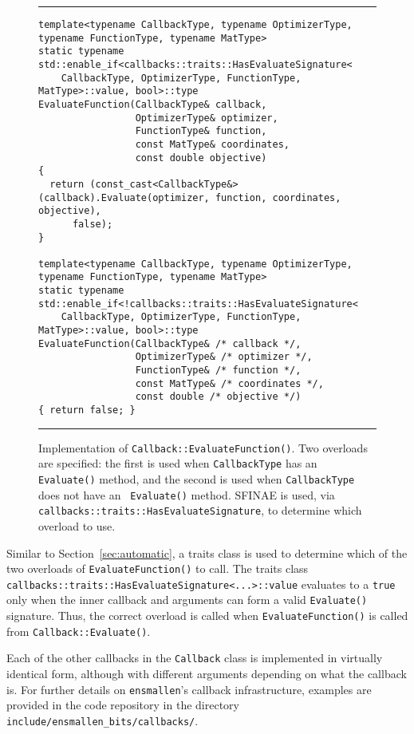 \begin{figure}[t!]
\hrule
\vspace{1ex}
\begin{verbatim}
template<typename CallbackType, typename OptimizerType, typename FunctionType, typename MatType>
static typename std::enable_if<callbacks::traits::HasEvaluateSignature<
    CallbackType, OptimizerType, FunctionType, MatType>::value, bool>::type
EvaluateFunction(CallbackType& callback,
                 OptimizerType& optimizer,
                 FunctionType& function,
                 const MatType& coordinates,
                 const double objective)
{
  return (const_cast<CallbackType&>(callback).Evaluate(optimizer, function, coordinates, objective),
      false);
}

template<typename CallbackType, typename OptimizerType, typename FunctionType, typename MatType>
static typename std::enable_if<!callbacks::traits::HasEvaluateSignature<
    CallbackType, OptimizerType, FunctionType, MatType>::value, bool>::type
EvaluateFunction(CallbackType& /* callback */,
                 OptimizerType& /* optimizer */,
                 FunctionType& /* function */,
                 const MatType& /* coordinates */,
                 const double /* objective */)
{ return false; }
\end{verbatim}
\hrule
\vspace*{-0.5em}
\label{fig:callback_evaluate_function}
\caption{Implementation of {\tt Callback::EvaluateFunction()}.  Two overloads
are specified: the first is used when {\tt CallbackType} has an {\tt Evaluate()}
method, and the second is used when {\tt CallbackType} does not have an {\tt
Evaluate()} method.  SFINAE is used, via {\tt
callbacks::traits::HasEvaluateSignature}, to determine which overload to use.}
\end{figure}

Similar to Section~\ref{sec:automatic}, a traits class is used to determine
which of the two overloads of {\tt EvaluateFunction()} to call.  The traits
class {\tt callbacks::traits::HasEvaluateSignature<...>::value}
evaluates to a {\tt true} only when the inner callback and arguments can form a
valid {\tt Evaluate()} signature.  Thus, the correct overload is called when
{\tt EvaluateFunction()} is called from {\tt Callback::Evaluate()}.

Each of the other callbacks in the {\tt Callback} class is implemented in
virtually identical form, although with different arguments depending on what
the callback is.  For further details on {\tt ensmallen}'s callback
infrastructure, examples are provided in the code repository in the directory
{\tt include/ensmallen\_bits/callbacks/}.

